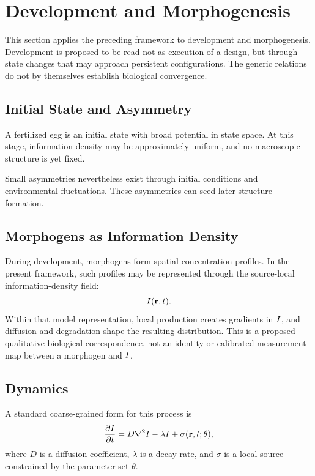 \section{Development and Morphogenesis}

This section applies the preceding framework to development and morphogenesis. Development is proposed to be read not as execution of a design, but through state changes that may approach persistent configurations. The generic relations do not by themselves establish biological convergence.

\subsection{Initial State and Asymmetry}

A fertilized egg is an initial state with broad potential in state space. At this stage, information density may be approximately uniform, and no macroscopic structure is yet fixed.

Small asymmetries nevertheless exist through initial conditions and environmental fluctuations. These asymmetries can seed later structure formation.

\subsection{Morphogens as Information Density}

During development, morphogens form spatial concentration profiles. In the present framework, such profiles may be represented through the source-local information-density field:
\begin{equation}
  I(\mathbf{r},t).
\end{equation}
Within that model representation, local production creates gradients in \(I\), and diffusion and degradation shape the resulting distribution. This is a proposed qualitative biological correspondence, not an identity or calibrated measurement map between a morphogen and \(I\).

\subsection{Dynamics}

A standard coarse-grained form for this process is
\begin{equation}
  \frac{\partial I}{\partial t}
  = D\nabla^2 I - \lambda I + \sigma(\mathbf{r},t;\theta),
\end{equation}
where \(D\) is a diffusion coefficient, \(\lambda\) is a decay rate, and \(\sigma\) is a local source constrained by the parameter set \(\theta\).

